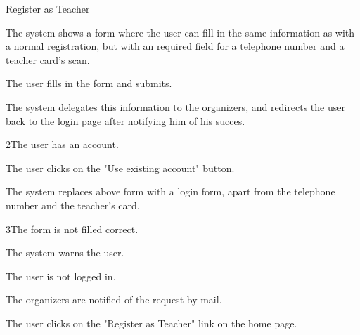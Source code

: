 
\begin{uc}{Register as Teacher}

    \begin{uc-mss}
    \item The system shows a form where the user can fill in the same
        information as with a normal registration, but with an required field
        for a telephone number and a teacher card's scan.
    \item The user fills in the form and submits.
    \item The system delegates this information to the organizers, and redirects
        the user back to the login page after notifying him of his succes.
    \end{uc-mss}

    \begin{uc-ext}

        \begin{uc-fail}{2}{The user has an account.}
        \item The user clicks on the "Use existing account" button.
        \item The system replaces above form with a login form, apart from the
            telephone number and the teacher's card.
        \end{uc-fail}
        
        \begin{uc-fail}{3}{The form is not filled correct.}
        \item The system warns the user.
        \end{uc-fail}

    \end{uc-ext}

    \begin{uc-pre}
    \item The user is not logged in.
    \end{uc-pre}

    \begin{uc-post}
    \item The organizers are notified of the request by mail.
    \end{uc-post}

    \begin{uc-trig}
        The user clicks on the "Register as Teacher" link on the home page.
    \end{uc-trig}

\end{uc}

